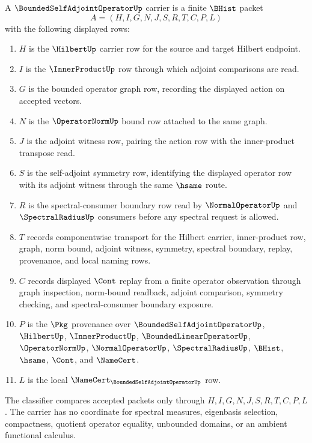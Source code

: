 \begin{definition}
\label{def:bounded-self-adjoint-operator-carrier}
A $\BoundedSelfAdjointOperatorUp$ carrier is a finite $\BHist$ packet
$$
A=(H,I,G,N,J,S,R,T,C,P,L)
$$
with the following displayed rows:
\begin{enumerate}
\item $H$ is the $\HilbertUp$ carrier row for the source and target Hilbert endpoint.
\item $I$ is the $\InnerProductUp$ row through which adjoint comparisons are read.
\item $G$ is the bounded operator graph row, recording the displayed action on accepted vectors.
\item $N$ is the $\OperatorNormUp$ bound row attached to the same graph.
\item $J$ is the adjoint witness row, pairing the action row with the inner-product transpose read.
\item $S$ is the self-adjoint symmetry row, identifying the displayed operator row with its adjoint witness through the same $\hsame$ route.
\item $R$ is the spectral-consumer boundary row read by $\NormalOperatorUp$ and $\SpectralRadiusUp$ consumers before any spectral request is allowed.
\item $T$ records componentwise transport for the Hilbert carrier, inner-product row, graph, norm bound, adjoint witness, symmetry, spectral boundary, replay, provenance, and local naming rows.
\item $C$ records displayed $\Cont$ replay from a finite operator observation through graph inspection, norm-bound readback, adjoint comparison, symmetry checking, and spectral-consumer boundary exposure.
\item $P$ is the $\Pkg$ provenance over $\BoundedSelfAdjointOperatorUp$, $\HilbertUp$, $\InnerProductUp$, $\BoundedLinearOperatorUp$, $\OperatorNormUp$, $\NormalOperatorUp$, $\SpectralRadiusUp$, $\BHist$, $\hsame$, $\Cont$, and $\NameCert$.
\item $L$ is the local $\NameCert_{\BoundedSelfAdjointOperatorUp}$ row.
\end{enumerate}
The classifier compares accepted packets only through $H,I,G,N,J,S,R,T,C,P,L$. The carrier has no coordinate for spectral measures, eigenbasis selection, compactness, quotient operator equality, unbounded domains, or an ambient functional calculus.
\end{definition}

